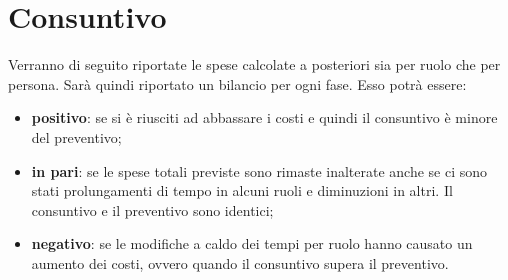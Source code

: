 \section{Consuntivo}
	Verranno di seguito riportate le spese calcolate a posteriori sia per ruolo che per persona.
	Sarà quindi riportato un bilancio per ogni fase. Esso potrà essere:
	\begin{itemize}
		\item \textbf{positivo}: se si è riusciti ad abbassare i costi e quindi il consuntivo è minore del preventivo;
		\item \textbf{in pari}: se le spese totali previste sono rimaste inalterate anche se ci sono stati prolungamenti di tempo in alcuni ruoli e diminuzioni in altri. Il consuntivo e il preventivo sono identici;
		\item \textbf{negativo}: se le modifiche a caldo dei tempi per ruolo hanno causato un aumento dei costi, ovvero quando il consuntivo supera il preventivo.
	\end{itemize}
	
						
						
